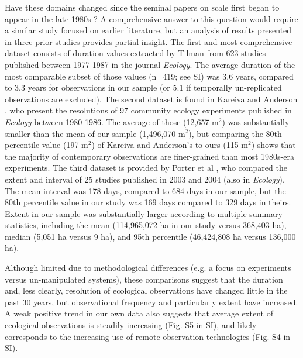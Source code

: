 \documentclass[12pt]{article}
\begin{document}
Have these domains changed since the seminal papers on scale first began to appear in the late 1980s \cite{wiens_spatial_1989, levin_problem_1992, tilman_ecological_1989}? A comprehensive answer to this question would require a similar study focused on earlier literature, but an analysis of results presented in three prior studies provides partial insight. The first and most comprehensive dataset consists of duration values extracted by Tilman \cite{tilman_ecological_1989} from 623 studies published between 1977-1987 in the journal \emph{Ecology}. The average duration of the most comparable subset of those values (n=419; see SI) was 3.6 years, compared to 3.3 years for observations in our sample (or 5.1 if temporally un-replicated observations are excluded). The second dataset is found in Kareiva and Anderson \cite{kareiva_spatial_1988}, who present the resolutions of 97 community ecology experiments published in \emph{Ecology} between 1980-1986. The average of those (12,657 m$^2$) was substantially smaller than the mean of our sample (1,496,070 m$^2$), but comparing the 80th percentile value (197 m$^2$) of Kareiva and Anderson's \cite{kareiva_spatial_1988} to ours (115 m$^2$) shows that the majority of contemporary observations are finer-grained than most 1980s-era experiments. The third dataset is provided by Porter et al \cite{porter_wireless_2005}, who compared the extent and interval of 25 studies published in 2003 and 2004 (also in \emph{Ecology}). The mean interval was 178 days, compared to 684 days in our sample, but the 80th percentile value in our study was 169 days compared to 329 days in theirs. Extent in our sample was substantially larger according to multiple summary statistics, including the mean (114,965,072 ha in our study versus 368,403 ha), median (5,051 ha versus 9 ha), and 95th percentile (46,424,808 ha versus 136,000 ha).  

Although limited due to methodological differences (e.g. a focus on experiments versus un-manipulated systems), these comparisons suggest that the duration and, less clearly, resolution of ecological observations have changed little in the past 30 years, but observational frequency and particularly extent have increased. A weak positive trend in our own data also suggests that average extent of ecological observations is steadily increasing (Fig. S5 in SI), and likely corresponds to the increasing use of remote observation technologies (Fig. S4 in SI).  
\end{document}
